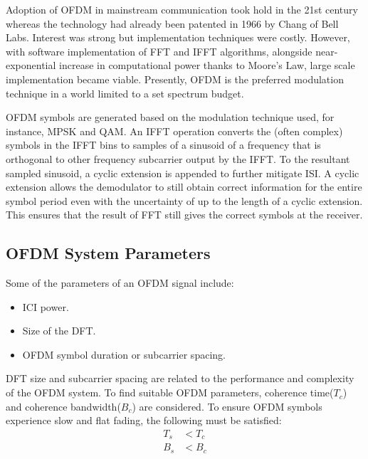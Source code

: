 Adoption of \gls{OFDM} in mainstream communication took hold in the 21st century whereas the technology had already been patented in 1966 by Chang of Bell Labs\cite{history_ofdm}. Interest was strong but implementation techniques were costly. However, with software implementation of \gls{FFT} and \gls{IFFT} algorithms, alongside near-exponential increase in computational power thanks to Moore's Law, large scale implementation became viable. Presently, \gls{OFDM} is the preferred modulation technique in a world limited to a set spectrum budget.

\gls{OFDM} \gls{symbol}s are generated based on the modulation technique used, for instance, \gls{MPSK} and \gls{QAM}. An \gls{IFFT} operation converts the (often complex) symbols in the \gls{IFFT} bins to samples of a sinusoid of a frequency that is orthogonal to other frequency \gls{subcarrier} output by the \gls{IFFT}. To the resultant sampled sinusoid, a cyclic extension is appended to further mitigate \gls{ISI}. A cyclic extension allows the demodulator to still obtain correct information for the entire symbol period even with the uncertainty of up to the length of a cyclic extension. This ensures that the result of \gls{FFT} still gives the correct symbols at the receiver.

\subsection*{\gls{OFDM} System Parameters}
Some of the parameters of an \gls{OFDM} signal include:
\begin{itemize}
	\item \gls{ICI} power.
	\item Size of the \gls{DFT}.
	\item \gls{OFDM} symbol duration or \gls{subcarrier} spacing.
\end{itemize}
\gls{DFT} size and \gls{subcarrier} spacing are related to the performance and complexity of the \gls{OFDM} system\cite{wireless_design}. To find suitable \gls{OFDM} parameters, coherence time($T_c$) and coherence bandwidth($B_c$) are considered. To ensure \gls{OFDM} symbols experience slow and flat fading, the following must be satisfied:
\begin{align*}
T_s &< T_c\\
B_s &< B_c
\end{align*}

